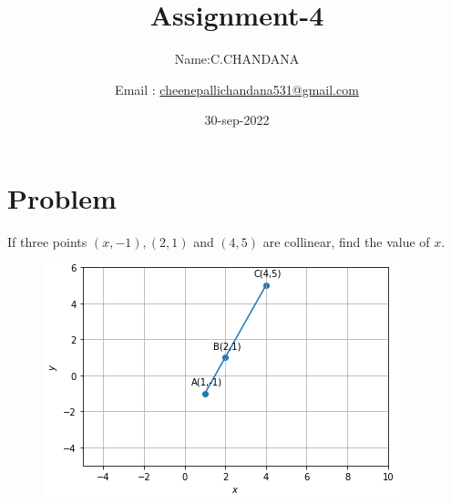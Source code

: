 \documentclass[10pt, a4paper]{article}
\begin{document}
\title{Assignment-4}
\author{Name:C.CHANDANA\and Email :  \url{cheenepallichandana531@gmail.com}}
\date{30-sep-2022}
\maketitle



\section{Problem}
\fi
If three points $(x, -1), (2, 1)$ and $(4, 5)$ are collinear, find the value of $x$.
\\
\solution 
	\begin{figure}[!ht]
		\centering
 \includegraphics[width=\columnwidth]{chapters/11/10/1/8/figs/sline.png}
		\caption{}
		\label{fig:11/10/1/8}
  	\end{figure}
	\iffalse
\end{document}
